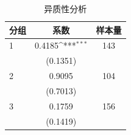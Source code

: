 \begin{table}[htbp]
\centering
\caption{异质性分析}
\label{tab:heterogeneity}
\def\sym#1{\ifmmode^{#1}\else\(^{#1}\)\fi}
\begin{tabular}{lcc}
\toprule
 分组 & 系数 & 样本量 \\
\midrule
1 & 0.4185\sym{***} & 143 \\
  & (0.1351) & \\
2 & 0.9095 & 104 \\
  & (0.7013) & \\
3 & 0.1759 & 156 \\
  & (0.1419) & \\
\bottomrule
\end{tabular}
\end{table}
